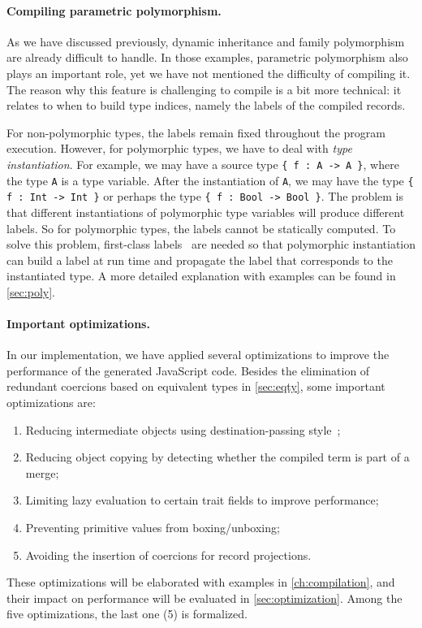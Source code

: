 \paragraph{Compiling parametric polymorphism.}
As we have discussed previously, dynamic inheritance and family polymorphism are
already difficult to handle. In those examples, parametric polymorphism also
plays an important role, yet we have not mentioned the difficulty of compiling
it. The reason why this feature is challenging to compile is a bit more
technical: it relates to when to build type indices, namely the labels of the
compiled records.

For non-polymorphic types, the labels remain fixed throughout the program
execution. However, for polymorphic types, we have to deal with \emph{type
instantiation}. For example, we may have a source type \lstinline|{ f : A -> A }|,
where the type \lstinline|A| is a type variable. After the instantiation of
\lstinline|A|, we may have the type \lstinline|{ f : Int -> Int }| or perhaps
the type \lstinline|{ f : Bool -> Bool }|. The problem is that different
instantiations of polymorphic type variables will produce different labels. So
for polymorphic types, the labels cannot be statically computed. To solve this
problem, first-class labels~\citep{leijen2004first} are needed so that
polymorphic instantiation can build a label at run time and propagate the label
that corresponds to the instantiated type. A more detailed explanation with
examples can be found in \autoref{sec:poly}.

\paragraph{Important optimizations.}
In our implementation, we have applied several optimizations to improve the
performance of the generated JavaScript code. Besides the elimination of
redundant coercions based on equivalent types in \autoref{sec:eqty}, some
important optimizations are:
\begin{enumerate}
\item Reducing intermediate objects using destination-passing
      style~\citep{shaikhha2017destination};
\item Reducing object copying by detecting whether the compiled term is part of
      a merge;
\item Limiting lazy evaluation to certain trait fields to improve performance;
\item Preventing primitive values from boxing/unboxing;
\item Avoiding the insertion of coercions for record projections.
\end{enumerate}
These optimizations will be elaborated with examples in
\autoref{ch:compilation}, and their impact on performance will be evaluated in
\autoref{sec:optimization}. Among the five optimizations, the last one (5) is
formalized.
